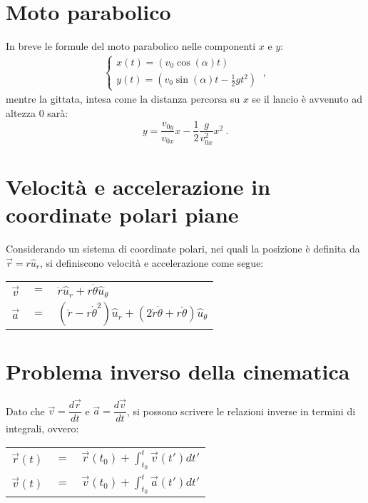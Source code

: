 \documentclass[12pt, oneside]{book}
\begin{document}
\section{Moto parabolico}
In breve le formule del moto parabolico nelle componenti $x$ e $y$:
\begin{align*}
	\begin{cases}
		x(t)=(v_0 \cos(\alpha)t)\\
		y(t)=(v_0 \sin(\alpha)t-\frac{1}{2}gt^2)
	\end{cases}~,
\end{align*}
mentre la gittata, intesa come la distanza percorsa su $x$ se il lancio è avvenuto ad altezza 0 sarà:
\[y=\dfrac{v_{0y}}{v_{0x}}x-\dfrac{1}{2}\dfrac{g}{v_{0x}^2}x^2~.\]

\section{Velocità e accelerazione in coordinate polari piane}
Considerando un sistema di coordinate polari, nei quali la posizione è definita da $\vec r = r \hat u_r$, si definiscono velocità e accelerazione come segue:
\begin{center}\begin{tabular}{r c l}
$\vec v$ & $=$ & $\dot r \hat u_r + r\dot\theta \hat u_\theta$\\
$\vec a$ & $=$ &$(\ddot r - r\dot \theta^2)\hat u_r + (2\dot r \dot \theta + r\ddot \theta)\hat u_\theta$
\end{tabular}\end{center}

\section{Problema inverso della cinematica}
Dato che $\vec v = \dfrac{d\vec r}{dt}$ e $\vec a = \dfrac{d\vec{v}}{dt}$, si possono scrivere le relazioni inverse in termini di integrali, ovvero:
\begin{center}\begin{tabular}{r c l}
$\vec r (t)$ & $=$ & $\vec r (t_0) + {\displaystyle \int_{t_0}^t \vec v (t')dt'}$\\[12pt]
$\vec v (t)$ & $=$ & $\vec v (t_0) + {\displaystyle \int_{t_0}^t \vec a (t')dt'}$
\end{tabular}\end{center}
\end{document}
